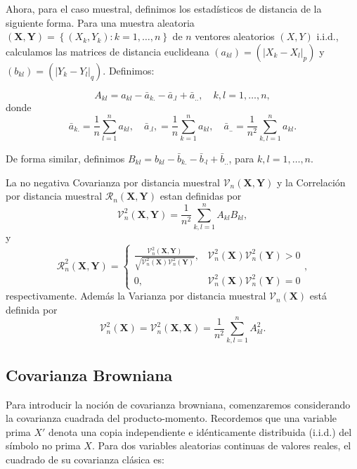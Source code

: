 	Ahora, para el caso muestral, definimos los estad\'isticos de distancia de la siguiente forma. Para una muestra aleatoria $(\mathbf{X}, \mathbf{Y})=\left\{\left(X_k, Y_k\right): k=1, \ldots, n\right\}$ de $n$ ventores aleatorios $(X, Y)$ i.i.d., calculamos las matrices de distancia euclideana  $\left(a_{k l}\right)=\left(\left|X_k-X_l\right|_p\right)$ y $\left(b_{k l}\right)=\left(\left|Y_k-Y_l\right|_q\right)$. Definimos:

	$$
	A_{k l}=a_{k l}-\bar{a}_{k .}-\bar{a}_{. l}+\bar{a}_{. .}, \quad k, l=1, \ldots, n,
	$$
	donde
	$$
	\bar{a}_{k .}=\frac{1}{n} \sum_{l=1}^n a_{k l}, \quad \bar{a}_{. l},=\frac{1}{n} \sum_{k=1}^n a_{k l}, \quad \bar{a}_{. .}=\frac{1}{n^2} \sum_{k, l=1}^n a_{k l} .
	$$
	
	De forma similar, definimos $B_{k l}=b_{k l}-\bar{b}_{k .}-\bar{b}_{\cdot l}+\bar{b}_{. .}$, para $k, l=1, \ldots, n$.

	\begin{defn}
		La no negativa Covarianza por distancia muestral $\mathcal{V}_n(\mathbf{X}, \mathbf{Y})$ y la Correlaci\'on por distancia muestral $\mathcal{R}_n(\mathbf{X}, \mathbf{Y})$ estan definidas por
		$$
		\mathcal{V}_n^2(\mathbf{X}, \mathbf{Y})=\frac{1}{n^2} \sum_{k, l=1}^n A_{k l} B_{k l},
		$$
		y
		$$
		\mathcal{R}_n^2(\mathbf{X}, \mathbf{Y})= \begin{cases}\frac{\mathcal{V}_n^2(\mathbf{X}, \mathbf{Y})}{\sqrt{\mathcal{V}_n^2(\mathbf{X}) \mathcal{V}_n^2(\mathbf{Y})}}, & \mathcal{V}_n^2(\mathbf{X}) \mathcal{V}_n^2(\mathbf{Y})>0 \\ 0, & \mathcal{V}_n^2(\mathbf{X}) \mathcal{V}_n^2(\mathbf{Y})=0\end{cases},
		$$
		respectivamente. Adem\'as la Varianza por distancia muestral $\mathcal{V}_n(\mathbf{X})$ est\'a definida por
		$$
		\mathcal{V}_n^2(\mathbf{X})=\mathcal{V}_n^2(\mathbf{X}, \mathbf{X})=\frac{1}{n^2} \sum_{k, l=1}^n A_{k l}^2 .
		$$
	\end{defn}

	\subsection{Covarianza Browniana}
		
		Para introducir la noci\'on de covarianza browniana, comenzaremos considerando la covarianza cuadrada del producto-momento. Recordemos que una variable prima $X'$ denota una copia independiente e id\'enticamente distribuida (i.i.d.) del símbolo no prima $X$. Para dos variables aleatorias continuas de valores reales, el cuadrado de su covarianza clásica es:

